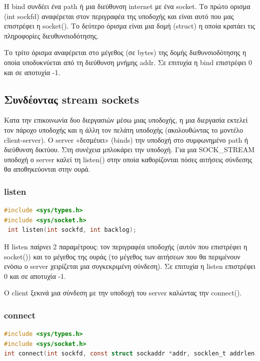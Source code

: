 Η bind συνδέει ένα path ή μια διεύθυνση internet με ένα socket. Το πρώτο ορισμα (int sockfd) αναφέρεται στον περιγραφέα της υποδοχής και είναι
αυτό που μας επιστρέφει η socket(). Το δεύτερο όρισμα είναι μια δομή (struct) η οποία κρατάει τις πληροφορίες διευθυνσιοδότησης.

Το τρίτο όρισμα αναφέρεται στο μέγεθος (σε bytes) της δομής διεθυνσιοδότησης η οποία υποδυκνύεται από τη διεύθυνση μνήμης addr. Σε επιτυχία
η bind επιστρέφει 0 και σε αποτυχία -1. 

\subsection*{Συνδέοντας stream sockets}
Κατα την επικοινωνία δυο διεργασιών μέσω μιας υποδοχής, η μια διεργασία εκτελεί τον πάροχο υποδοχής και η άλλη τον πελάτη υποδοχής
(ακολουθώντας το μοντέλο client-server). Ο server «δεσμέυει» (binds) την υποδοχή στο συμφωνημένο path ή διεύθυνση δικτύου. Στη συνέχεια
μπλοκάρει την υποδοχή. Για μια SOCK\_STREAM υποδοχή ο server καλεί τη listen() στην οποία καθορίζονται πόσες αιτήσεις σύνδεσης θα
αποθηκεύονται στην ουρά.

\subsubsection*{listen}
\begin{lstlisting}[language=C,breaklines=true, frame=none, backgroundcolor=\color{lightgray}, basicstyle=\footnotesize\ttfamily]
#include <sys/types.h>          
#include <sys/socket.h>
 int listen(int sockfd, int backlog);
\end{lstlisting}


Η listen παίρνει 2 παραμέτρους: τον περιγραφέα υποδοχής (αυτόν που επιστρέφει η socket()) και το μέγεθος της ουράς (το μέγεθος των αιτήσεων
που θα περιμένουν ενόσω ο server χειρίζεται μια συγκεκριμένη σύνδεση).
Σε επιτυχία η listen επιστρέφει 0 και σε αποτυχία -1. 



Ο client ξεκινά μια σύνδεση με την υποδοχή του server καλώντας την connect().


\subsubsection*{connect}
\begin{lstlisting}[language=C,breaklines=true, frame=none, backgroundcolor=\color{lightgray}, basicstyle=\footnotesize\ttfamily]
#include <sys/types.h>          
#include <sys/socket.h>
int connect(int sockfd, const struct sockaddr *addr, socklen_t addrlen)
\end{lstlisting}



